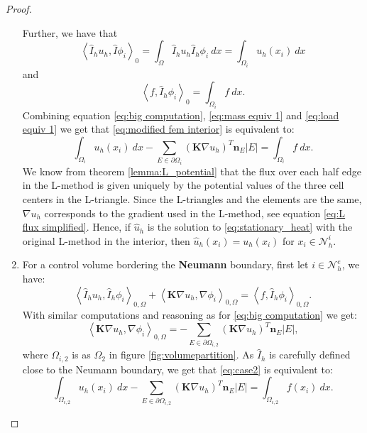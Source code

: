 \documentclass[../Main/main.tex]{subfiles}
\begin{document}
\begin{proof}
\begin{enumerate}
			Further, we have that 
			\begin{equation}\label{eq:mass equiv 1}
				\left \langle \hat{I}_h  u_h,\hat{I}\phi_i \right \rangle_0 = \int_{\Omega}\hat{I}_h u_h \hat{I}_h \phi_i \ dx =  \int_{\Omega_i}u_h(x_i) \ dx
			\end{equation}
			and
			\begin{equation}\label{eq:load equiv 1}
				\left \langle f,\hat{I}_h \phi_i \right \rangle_0 = \int_{\Omega_i}f \ dx.
			\end{equation}
			Combining equation \eqref{eq:big computation}, \eqref{eq:mass equiv 1} and \eqref{eq:load equiv 1} we get that \eqref{eq:modified fem interior} is equivalent to:
			\begin{equation}
				\int_{\Omega_i}u_h(x_i) \ dx - \sum_{E\in \partial \Omega_i} (\pmb{K}\nabla u_h)^T\bm{n}_E |E| = \int_{\Omega_i}f \ dx.
			\end{equation}
			We know from theorem \ref{lemma:L_potential} that the flux over each half edge in the L-method is given uniquely by the potential values of the three cell centers in the L-triangle. Since the L-triangles and the elements are the same, $\nabla u_h$ corresponds to the gradient used in the L-method, see equation \eqref{eq:L flux simplified}. Hence, if $\hat{u}_h$ is the solution to \eqref{eq:stationary_heat} with the original L-method in the interior, then $\hat{u}_h(x_i)=u_h(x_i)$ for $x_i\in \mathcal{N}^i_h$. 
			\item For a control volume bordering the \textbf{Neumann} boundary, first let $i\in \mathcal{N}_h^e$, we have:
			\begin{equation}\label{eq:case2}
				\left \langle \hat{I}_h u_h,\hat{I}_h \phi_i \right \rangle_{0,\Omega} +   \left \langle\bm{K} \nabla u_h,\nabla \phi_i \right \rangle_{0,\Omega} = \left \langle f,\hat{I}_h \phi_i \right \rangle_{0,\Omega}.
			\end{equation}
			With similar computations and reasoning as for \eqref{eq:big computation} we get:
			\begin{equation}
					\left \langle\bm{K} \nabla u_h,\nabla \phi_i \right \rangle_{0,\Omega}= 
					- \sum_{E\in \partial \Omega_{i,2}} (\pmb{K}\nabla u_h)^T\bm{n}_E |E|, 
			\end{equation}
			where $\Omega_{i,2}$ is as $\Omega_2$ in figure \ref{fig:volumepartition}. As $\hat{I}_h$ is carefully defined close to the Neumann boundary, we get that \eqref{eq:case2} is equivalent to:
			\begin{equation}\label{eq:FVML neumann cell}	\int_{\Omega_{i,2}}u_h(x_i) \ dx - \sum_{E\in \partial \Omega_{i,2}} (\pmb{K}\nabla u_h)^T\bm{n}_E |E| = \int_{\Omega_{i,2}}f(x_i) \ dx.

\end{equation}
\end{enumerate}
\end{proof}
\end{document}
